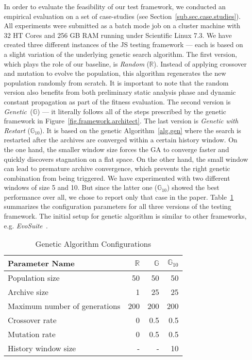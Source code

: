 \documentclass[sigconf,review]{acmart}
\newcommand{\Random}{\mathbb{R}}
\newcommand{\Genetic}{\mathbb{G}}
\newcommand{\RGenetic}{\mathbb{G}_{10}}
\begin{document}
In order to evaluate the feasibility of our test framework, we conducted an empirical evaluation on a set of case-studies (see Section~\ref{sub.sec.case.studies}). All experiments were submitted as a batch mode job on a cluster machine with 32 HT Cores and 256 GB RAM running under Scientific Linux 7.3. We have created three different instances of the JS testing framework --- each is based on a slight variation of the underlying genetic search algorithm. The first version, which plays the role of our baseline, is \emph{Random} ($\Random$). Instead of applying crossover and mutation to evolve the population, this algorithm regenerates the new population randomly from scratch. It is important to note  that the random version also benefits from both preliminary static analysis phase and dynamic constant propagation as part of the fitness evaluation. The second version is \emph{Genetic}~($\Genetic$) --- it literally follows all of the steps prescribed by the genetic framework in Figure~\ref{fig.framework.architect}. The last version is \emph{Genetic with Restart} ($\RGenetic$). It is based on the genetic Algorithm~\ref{alg.gen} where the search is restarted after the archives are converged within a certain history window. On the one hand, the smaller window size forces the GA to converge faster and quickly discovers stagnation on a flat space. On the other hand, the small window can lead to premature archive convergence, which prevents the right genetic combination from being triggered. We have experimented with two different windows of size 5 and 10. But since the latter one ($\RGenetic$) showed the best performance over all, we chose to report only that case in the paper. Table~\ref{tbl.gen.config} summarizes the configuration parameters for all three versions of the testing framework. The initial setup for genetic algorithm is similar to other frameworks, e.g. \emph{EvoSuite}~\cite{fraser2011evosuite}. 

\begin{table}
  \caption{Genetic Algorithm Configurations}
  \label{tbl.gen.config}
    \scriptsize
  \begin{tabular}{l|r|r|r}
    \toprule
    \textbf{Parameter Name} &$\Random$&$\Genetic$ &$\RGenetic$ \\
    \hline
    Population size                   & 50  & 50  & 50  \\
    Archive size                      & 1   & 25  & 25  \\
    Maximum number of generations     & 200 & 200 & 200 \\
    Crossover rate                    & 0   & 0.5 & 0.5 \\
    Mutation rate                     & 0   & 0.5 & 0.5 \\
    History window size               & -   & -   & 10  \\
    \bottomrule
  \end{tabular}
\end{table}
\end{document}
